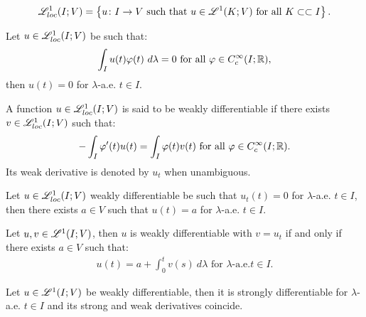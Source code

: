 \begin{definition}
    \begin{gather}
        \mathscr{L}^{1}_{loc}(I; V) = \left\{ u\colon I \rightarrow V  \text{ such that } u \in \mathscr{L}^{1}(K; V) \text{ for all } K \subset \subset I \right\}.
    \end{gather}
\end{definition}

\begin{corollary}
    Let $u \in \mathscr{L}^{1}_{loc}(I; V)$ be such that:
    \begin{gather}
        \int_I u(t) \varphi(t) ~ d \lambda = 0 \text{ for all } \varphi \in C_c^{\infty}(I; \mathbb{R}),
    \end{gather}
    then $u(t) = 0$ for $\lambda$-a.e. $t \in I$.
\end{corollary}

\begin{definition}
    A function $u \in \mathscr{L}^{1}_{loc}(I; V)$ is said to be weakly differentiable if there exists $v \in \mathscr{L}^{1}_{loc}(I; V)$ such that:
    \begin{gather}
        - \int_I \varphi^{\prime}(t) u(t) = \int_I \varphi(t) v(t) \text{ for all } \varphi \in C_c^{\infty}(I; \mathbb{R}).
    \end{gather}
    Its weak derivative is denoted by $u_t$ when unambiguous.
\end{definition}

\begin{lemma}
    Let $u \in \mathscr{L}^{1}_{loc}(I; V)$ weakly differentiable be such that $u_t(t) = 0$ for $\lambda$-a.e. $t \in I$, then there exists $a \in V$ such that $u(t) = a$ for $\lambda$-a.e. $t \in I$.
\end{lemma}

\begin{theorem}
    Let $u, v \in \mathscr{L}^{1}(I; V)$, then $u$ is weakly differentiable with $v = u_t$ if and only if there exists $a \in V$ such that:
    \begin{gather}
        u(t) = a + \int_0^t v(s) ~ d \lambda \text{ for } \lambda \text{-a.e.} t \in I.
    \end{gather}
\end{theorem}

\begin{corollary}
    Let $u \in \mathscr{L}^{1}(I; V)$ be weakly differentiable, then it is strongly differentiable for $\lambda$-a.e. $t \in I$ and its strong and weak derivatives coincide.
\end{corollary}

